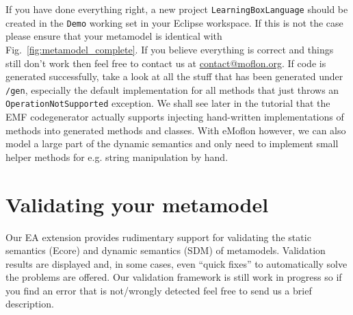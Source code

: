 If you have done everything right, a new project \texttt{LearningBoxLanguage} should be created in the \texttt{Demo} working set in your Eclipse workspace.
If this is not the case please ensure that your metamodel is identical with Fig.~\ref{fig:metamodel_complete}.
If you believe everything is correct and things still don't work then feel free to contact us at \href{mailto:contact@moflon.org}{contact@moflon.org}.
If code is generated successfully, take a look at all the stuff that has been generated under \texttt{/gen}, especially the default  implementation for all methods that just throws an  \texttt{OperationNotSupported} exception.
We shall see later in the tutorial that the EMF codegenerator actually supports injecting hand-written implementations of methods into generated methods and classes.
With eMoflon however, we can also model a large part of the dynamic semantics and only need to implement small helper methods for e.g. string manipulation by hand.

\section{Validating your metamodel}
\label{sect:validating}


Our EA extension provides rudimentary support for validating the static semantics (Ecore) and dynamic semantics (SDM) of metamodels.
Validation results are displayed and, in some cases, even ``quick fixes'' to automatically solve the problems are offered.
Our validation framework is still work in progress so if you find an error that is not/wrongly detected feel free to send us a brief description.

